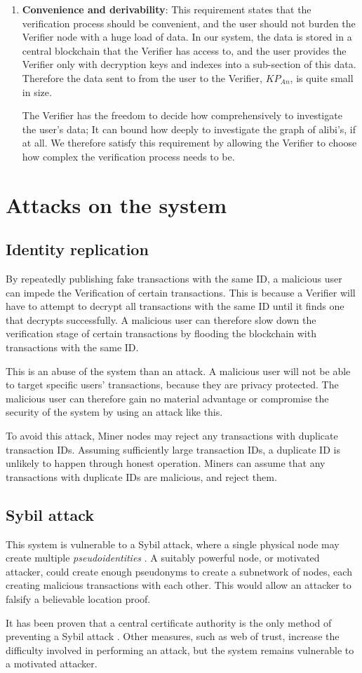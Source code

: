 \begin{enumerate}
\item[] \textbf{Convenience and derivability}: This requirement states that the verification process should be convenient, and the user should not burden the Verifier node with a huge load of data. In our system, the data is stored in a central blockchain that the Verifier has access to, and the user provides the Verifier only with decryption keys and indexes into a sub-section of this data. Therefore the data sent to from the user to the Verifier, $KP_{An}$, is quite small in size.

The Verifier has the freedom to decide how comprehensively to investigate the user's data; It can bound how deeply to investigate the graph of alibi's, if at all. We therefore satisfy this requirement by allowing the Verifier to choose how complex the verification process needs to be.
\end{enumerate}

\section{Attacks on the system}
\subsection{Identity replication}
By repeatedly publishing fake transactions with the same ID, a malicious user can impede the Verification of certain transactions. This is because a Verifier will have to attempt to decrypt all transactions with the same ID until it finds one that decrypts successfully. A malicious user can therefore slow down the verification stage of certain transactions by flooding the blockchain with transactions with the same ID.

This is an abuse of the system than an attack. A malicious user will not be able to target specific users' transactions, because they are privacy protected. The malicious user can therefore gain no material advantage or compromise the security of the system by using an attack like this.

To avoid this attack, Miner nodes may reject any transactions with duplicate transaction IDs. Assuming sufficiently large transaction IDs, a duplicate ID is unlikely to happen through honest operation. Miners can assume that any transactions with duplicate IDs are malicious, and reject them.

\subsection{Sybil attack}
This system is vulnerable to a Sybil attack, where a single physical node may create multiple \textit{pseudoidentities} \cite{sybil}. A suitably powerful node, or motivated attacker, could create enough pseudonyms to create a subnetwork of nodes, each creating malicious transactions with each other. This would allow an attacker to falsify a believable location proof.

It has been proven that a central certificate authority is the only method of preventing a Sybil attack \cite{sybil}. Other measures, such as web of trust, increase the difficulty involved in performing an attack, but the system remains vulnerable to a motivated attacker.